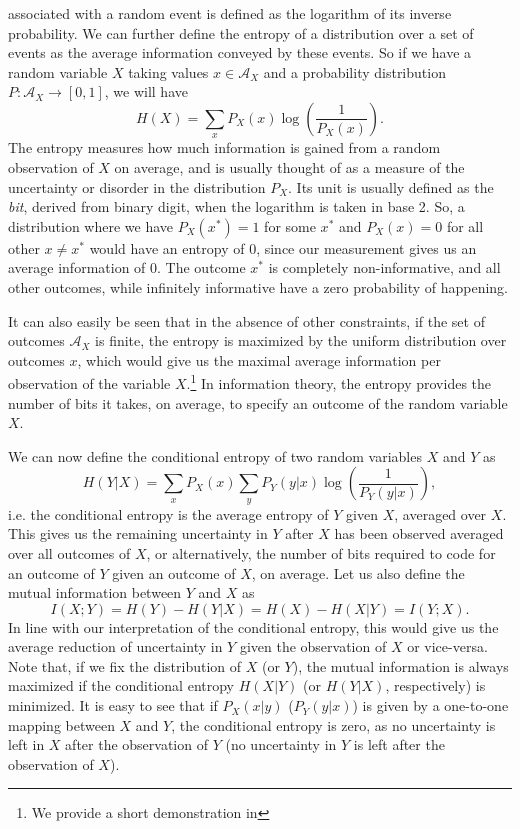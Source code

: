  associated with a random event is defined as the logarithm of its inverse probability. We can further define the entropy of a distribution over a set of events as the average information conveyed by these events. So if we have a random variable $X$ taking values $x \in \mathcal{A}_X$ and a probability distribution $P : \mathcal{A}_X \to [0,1]$, we will have
$$
H(X)= \sum_x P_X(x) \log\left(\frac{1}{P_X(x)}\right).
$$
The entropy measures how much information is gained from a random observation of $X$ on average, and is usually thought of as a measure of the uncertainty or disorder in the distribution $P_X$. Its unit is usually defined as the {\em bit}, derived from binary digit, when the logarithm is taken in base 2. So, a distribution where we have $P_X(x^*) = 1$ for some $x^*$ and $P_X(x) = 0$ for all other $x\neq x^*$ would have an entropy of $0$, since our measurement gives us an average information of $0$. The outcome $x^*$ is completely non-informative, and all other outcomes, while infinitely informative have a zero probability of happening.\par
It can also easily be seen that in the absence of other constraints, if the set of outcomes $\mathcal{A}_X$ is finite, the entropy is maximized by the uniform distribution over outcomes $x$, which would give us the maximal average information per observation of the variable $X$.\footnote{We provide a short demonstration in } In information theory, the entropy provides the number of bits it takes, on average, to specify an outcome of the random variable $X$.\par
We can now define the conditional entropy of two random variables $X$ and $Y$ as
$$
H(Y|X) = \sum_x P_X(x) \sum_y P_Y(y|x) \log\left(\frac{1}{P_Y(y|x)}\right),
$$
i.e. the conditional entropy is the average entropy of $Y$ given $X$, averaged over $X$. This gives us the remaining uncertainty in $Y$ after $X$ has been observed averaged over all outcomes of $X$, or alternatively, the number of bits required to code for an outcome of $Y$ given an outcome of $X$, on average. Let us also define the mutual information between $Y$ and $X$ as
$$
I(X;Y) = H(Y) - H(Y|X) = H(X) - H(X|Y) = I(Y;X).
$$
In line with our interpretation of the conditional entropy, this would give us the average reduction of uncertainty in $Y$ given the observation of $X$ or vice-versa. Note that, if we fix the distribution of $X$ (or $Y$), the mutual information is always maximized if the conditional entropy $H(X|Y)$ (or $H(Y|X)$, respectively) is minimized. It is easy to see that if $P_X(x|y)$ ($P_Y(y|x)$) is given by a one-to-one mapping between $X$ and $Y$, the conditional entropy is zero, as no uncertainty is left in $X$ after the observation of $Y$ (no uncertainty in $Y$ is left after the observation of $X$).\par
